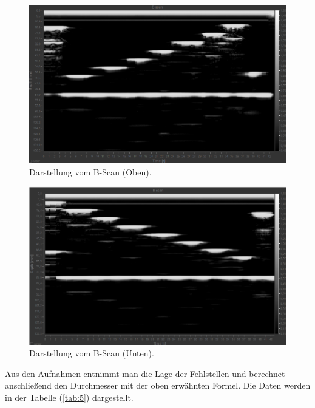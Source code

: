 \begin{figure}[H]
  \centering
  \includegraphics[width=\textwidth]{content/B-Scan2.png}
  \caption{Darstellung vom B-Scan (Oben).}
  \label{abb:5}
\end{figure}
\begin{figure}[H]
  \centering
  \includegraphics[width=\textwidth]{content/B-Scan1.png}
  \caption{Darstellung vom B-Scan (Unten).}
  \label{abb:6}
\end{figure}
Aus den Aufnahmen entnimmt man die Lage der Fehlstellen und berechnet
anschließend den Durchmesser mit der oben erwähnten Formel. Die Daten werden
in der Tabelle (\ref{tab:5}) dargestellt.
